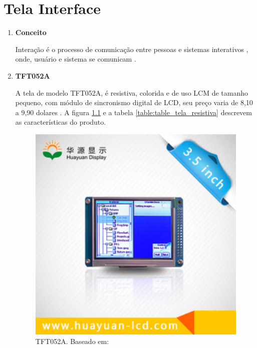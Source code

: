 \chapter[Tela Interface]{Tela Interface}
\begin{enumerate}
\item \textbf{Conceito}

Interação é o processo de comunicação entre pessoas e sistemas interativos \cite{prates},
onde, usuário e sistema se comunicam \cite{preece}.

\item \textbf{TFT052A}

A tela de modelo TFT052A, é resistiva, colorida e de uso LCM de tamanho pequeno,
com módulo de sincronismo digital de LCD, seu preço varia de 8,10 a 9,90 dolares \cite{tela_resistiva}.
A figura \ref{fig:imagem_interface} e a tabela \ref{table:table_tela_resistiva} descrevem as
características do produto.

\begin{figure}[h]
  \centering
  \includegraphics[width=400px, scale=1]{figuras/imagem_interface}
  \caption{TFT052A. Baseado em: \cite{tela_resistiva}}
\label{fig:imagem_interface}
\end{figure}


\end{enumerate}
